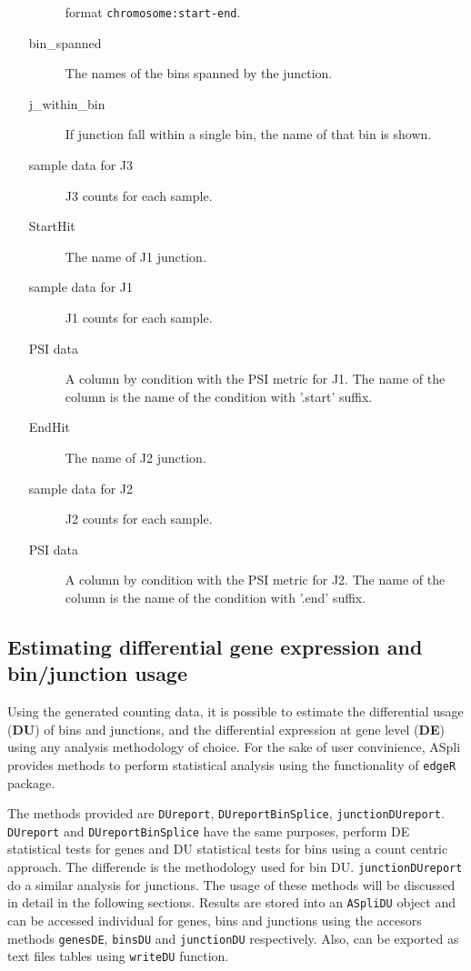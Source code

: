 \documentclass{article}
\begin{document}
\begin{itemize}
\begin{description}
      format \texttt{chromosome:start-end}.
      \item[bin\_spanned] The names of the bins spanned by the junction.
      \item[j\_within\_bin] If junction fall within a single bin, the name of
      that bin is shown.
      \item[sample data for J3] J3 counts for each sample.
      \item[StartHit] The name of J1 junction.
      \item[sample data for J1] J1 counts for each sample.
      \item[PSI data] A column by condition with the PSI metric for J1. The name
      of the column is the name of the condition with '.start' suffix.
      \item[EndHit] The name of J2 junction.
      \item[sample data for J2] J2 counts for each sample.
      \item[PSI data] A column by condition with the PSI metric for J2. The name
      of the column is the name of the condition with '.end' suffix.
      \\
    \end{description}  

\end{itemize}

\subsection{ Estimating differential gene expression and bin/junction usage}

Using the generated counting data, it is possible to estimate the differential
usage (\textbf{DU}) of bins and junctions, and the differential expression at
gene level (\textbf{DE}) using any analysis methodology of choice. For the sake
of user convinience, ASpli provides methods to perform statistical analysis 
using the functionality of \texttt{edgeR} package.

The methods provided are \texttt{DUreport}, \texttt{DUreportBinSplice},
\texttt{junctionDUreport}. \texttt{DUreport} and \texttt{DUreportBinSplice}
have the same purposes, perform DE statistical tests for genes and DU
statistical tests for bins using a count centric approach.
The differende is the methodology used for bin DU. \texttt{junctionDUreport} do
a similar analysis for junctions. The usage of these methods will be discussed in detail
in the following sections. Results are stored into an \texttt{ASpliDU} object
and can be accessed individual for genes, bins and junctions using the accesors
methods \texttt{genesDE}, \texttt{binsDU} and \texttt{junctionDU}
respectively. Also, can be exported as text files tables using \texttt{writeDU}
function.
\end{document}
